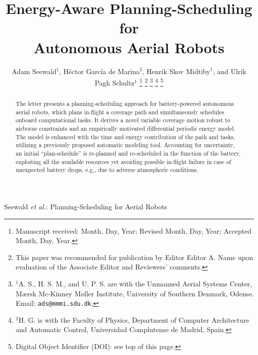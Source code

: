 \documentclass[letterpaper,10pt,journal,twoside]{IEEEtran}
\theoremstyle{definition}
\begin{document}
\title{Energy-Aware Planning-Scheduling for\\Autonomous Aerial Robots}

\author{
  Adam Seewald$^{\text{1}}$, H\'ector Garc\'ia de Marina$^{\text{2}}$, Henrik Skov Midtiby$^{\text{1}}$, and Ulrik Pagh Schultz$^{\text{1}}$
  \thanks{Manuscript received: Month, Day, Year; Revised Month, Day, Year; Accepted Month, Day, Year.}%
  \thanks{This paper was recommended for publication by Editor Editor A. Name upon evaluation of the Associate Editor and Reviewers' comments.} %
  \thanks{$^{\text{1}}$A. S., H. S. M.,  and U. P. S. are with the Unmanned Aerial Systems Center, M{\ae}rsk Mc-Kinney M{\o}ller Institute, University of Southern Denmark, Odense. Email: {\tt\footnotesize ads@mmmi.sdu.dk};} 
  \thanks{$^{\text{2}}$H. G. is with the Faculty of Physics, Department of Computer Architecture and Automatic Control, Universidad Complutense de Madrid, Spain.}
  \thanks{Digital Object Identifier (DOI): see top of this page.}
}

{Seewald \MakeLowercase{\textit{et al.}}: Planning-Scheduling for Aerial Robots} 

\maketitle

\begin{abstract}
  The letter presents a planning-scheduling approach for battery-powered autonomous aerial robots, which plans in-flight a coverage path and simultaneously schedules onboard computational tasks. It derives a novel variable coverage motion robust to airborne constraints and an empirically motivated differential periodic energy model. The model is enhanced with the time and energy contribution of the path and tasks, utilizing a previously proposed automatic modeling tool. Accounting for uncertainty, an initial ``plan-schedule'' is re-planned and re-scheduled in the function of the battery, exploiting all the available resources yet avoiding possible in-flight failure in case of unexpected battery drops, e.g., due to adverse atmospheric conditions.
\end{abstract}
\end{document}
